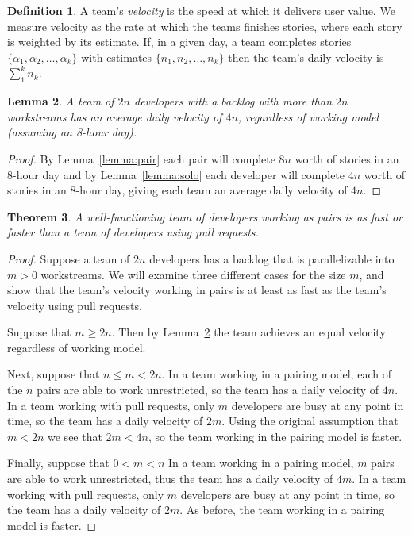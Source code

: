 \documentclass[letterpaper]{article}
\newtheorem{theorem}{Theorem}[section]
\newtheorem{lemma}[theorem]{Lemma}
\theoremstyle{definition}
\newtheorem{definition}[theorem]{Definition}
\begin{document}
    \begin{definition}
        A team's \textit{velocity} is the speed at which it delivers user value.
        We measure velocity as the rate at which the teams finishes stories, where each story is weighted by its
        estimate.
        If, in a given day, a team completes stories $\{\alpha_1, \alpha_2,\dots,\alpha_k\}$ with estimates
        $\{n_1, n_2,\dots,n_k\}$ then the team's daily velocity is $\sum_1^k n_k$.
    \end{definition}

    \begin{lemma}
        \label{lemma:parallel}
        A team of $2n$ developers with a backlog with more than $2n$ workstreams has an average daily velocity of $4n$,
        regardless of working model (assuming an 8-hour day).
    \end{lemma}
    \begin{proof}
        By Lemma~\ref{lemma:pair} each pair will complete $8n$ worth of stories in an 8-hour day and by
        Lemma~\ref{lemma:solo} each developer will complete $4n$ worth of stories in an 8-hour day, giving each team an
        average daily velocity of $4n$.
    \end{proof}

    \begin{theorem}
        A well-functioning team of developers working as pairs is as fast or faster than a team of developers using pull
        requests.
    \end{theorem}
    \begin{proof}
        Suppose a team of $2n$ developers has a backlog that is parallelizable into $m > 0$ workstreams.
        We will examine three different cases for the size $m$, and show that the team's velocity working in pairs is at
        least as fast as the team's velocity using pull requests.

        Suppose that $m\geq 2n$.
        Then by Lemma~\ref{lemma:parallel} the team achieves an equal velocity regardless of working model.

        Next, suppose that $n\leq m < 2n$.
        In a team working in a pairing model, each of the $n$ pairs are able to work unrestricted, so the team has a
        daily velocity of $4n$.
        In a team working with pull requests, only $m$ developers are busy at any point in time, so the team has a daily
        velocity of $2m$.
        Using the original assumption that $m < 2n$ we see that $2m < 4n$, so the team working in the pairing model is
        faster.

        Finally, suppose that $0 < m < n$
        In a team working in a pairing model, $m$ pairs are able to work unrestricted, thus the team has a daily
        velocity of $4m$.
        In a team working with pull requests, only $m$ developers are busy at any point in time, so the team has a daily
        velocity of $2m$.
        As before, the team working in a pairing model is faster.
    \end{proof}
\end{document}
